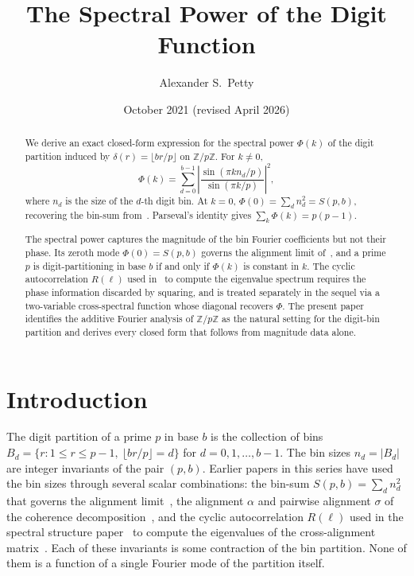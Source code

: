 \documentclass[12pt]{amsart}
\title{The Spectral Power of the Digit Function}
\author{Alexander S.\ Petty}
\date{October 2021 (revised April 2026)}
\theoremstyle{definition}
\theoremstyle{remark}
\begin{document}
\begin{abstract}
We derive an exact closed-form expression for the spectral
power $\Phi(k)$ of the digit partition induced by
$\delta(r) = \lfloor br/p \rfloor$ on
$\mathbb{Z}/p\mathbb{Z}$. For $k \ne 0$,
\[
\Phi(k) = \sum_{d=0}^{b-1}
\left|\frac{\sin(\pi k n_d / p)}{\sin(\pi k / p)}\right|^2,
\]
where $n_d$ is the size of the $d$-th digit bin. At $k = 0$,
$\Phi(0) = \sum_d n_d^2 = S(p,b)$, recovering the bin-sum
from~\cite{paper3}. Parseval's identity gives
$\sum_k \Phi(k) = p(p-1)$.

The spectral power captures the magnitude of the bin
Fourier coefficients but not their phase. Its zeroth mode
$\Phi(0) = S(p,b)$ governs the alignment limit
of~\cite{paper3}, and a prime $p$ is digit-partitioning
in base $b$ if and only if $\Phi(k)$ is constant in $k$.
The cyclic autocorrelation $R(\ell)$ used
in~\cite{paper7} to compute the eigenvalue spectrum
requires the phase information discarded by squaring,
and is treated separately in the sequel via a
two-variable cross-spectral function whose
diagonal recovers $\Phi$. The present paper identifies
the additive Fourier analysis of
$\mathbb{Z}/p\mathbb{Z}$ as the natural setting for the
digit-bin partition and derives every closed form that
follows from magnitude data alone.
\end{abstract}
\maketitle

\section{Introduction}

The digit partition of a prime $p$ in base $b$ is the
collection of bins
$B_d = \{r : 1 \le r \le p{-}1,\ \lfloor br/p \rfloor = d\}$
for $d = 0, 1, \ldots, b{-}1$. The bin sizes $n_d = |B_d|$
are integer invariants of the pair $(p,b)$. Earlier papers in
this series have used the bin sizes through several scalar
combinations: the bin-sum $S(p,b) = \sum_d n_d^2$ that
governs the alignment limit~\cite{paper3}, the alignment
$\alpha$ and pairwise alignment $\sigma$ of the coherence
decomposition~\cite{paper5}, and the cyclic autocorrelation
$R(\ell)$ used in the spectral structure paper~\cite{paper7}
to compute the eigenvalues of the cross-alignment
matrix~\cite{paper6}. Each of these invariants is some
contraction of the bin partition. None of them is a function
of a single Fourier mode of the partition itself.
\end{document}
